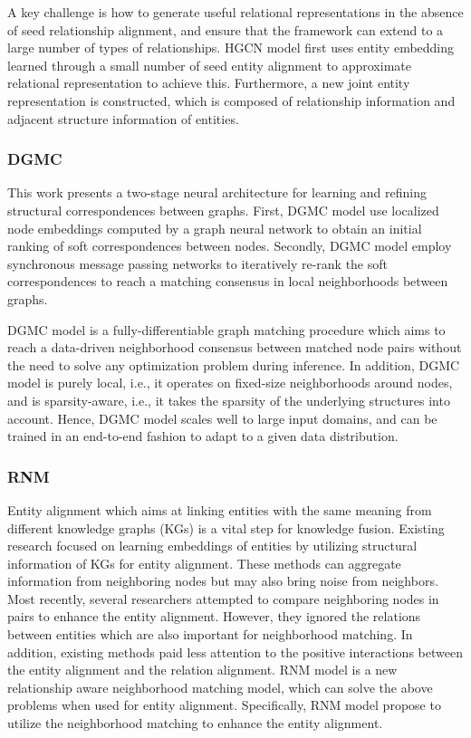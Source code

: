 \documentclass[sigconf]{acmart}
\begin{document}
{A key challenge is how to generate useful relational representations in the absence of seed relationship alignment, and ensure that the framework can extend to a large number of types of relationships. HGCN model first uses entity embedding learned through a small number of seed entity alignment to approximate relational representation to achieve this. Furthermore, a new joint entity representation is constructed, which is composed of relationship information and adjacent structure information of entities.

\subsubsection{DGMC \cite{fey2020deep}}

This work presents a two-stage neural architecture for learning and refining structural correspondences between graphs. First, DGMC model use localized node embeddings computed by a graph neural network to obtain an initial ranking of soft correspondences between nodes. Secondly, DGMC model employ synchronous message passing networks to iteratively re-rank the soft correspondences to reach a matching consensus in local neighborhoods between graphs. 

DGMC model is a fully-differentiable graph matching procedure which aims to reach a data-driven neighborhood consensus between matched node pairs without the need to solve any optimization problem during inference. In addition, DGMC model is purely local, i.e., it operates on fixed-size neighborhoods around nodes, and is sparsity-aware, i.e., it takes the sparsity of the underlying structures into account. Hence, DGMC model scales well to large input domains, and can be trained in an end-to-end fashion to adapt to a given data distribution.

\subsubsection{RNM \cite{zhu2021relation}}

Entity alignment which aims at linking entities with the same meaning from different knowledge graphs (KGs) is a vital step for knowledge fusion. Existing research focused on learning embeddings of entities by utilizing structural information of KGs for entity alignment. These methods can aggregate information from neighboring nodes but may also bring noise from neighbors. Most recently, several researchers attempted to compare neighboring nodes in pairs to enhance the entity alignment. However, they ignored the relations between entities which are also important for neighborhood matching. In addition, existing methods paid less attention to the positive interactions between the entity alignment and the relation alignment. RNM model is a new relationship aware neighborhood matching model, which can solve the above problems when used for entity alignment. Specifically, RNM model propose to utilize the neighborhood matching to enhance the entity alignment. 

}
\end{document}
